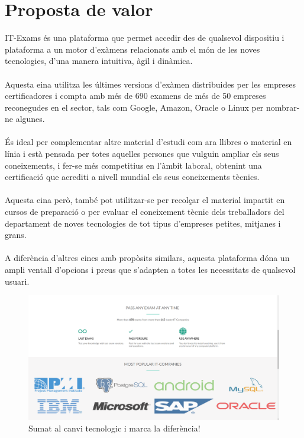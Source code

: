 \documentclass[12pt]{article}
\begin{document}
\section{Proposta de valor}
IT-Exams és una plataforma que permet accedir des de qualsevol dispositiu i plataforma a un motor d'exàmens relacionats amb el món de les noves tecnologies, d'una manera intuitiva, àgil i dinàmica. 
\\\\Aquesta eina utilitza les últimes versions d'exàmen distribuides per les empreses certificadores i compta amb més de 690 examens de més de 50 empreses reconegudes en el sector, tals com Google, Amazon, Oracle o Linux per nombrar-ne algunes. 
\\\\És ideal per complementar altre material d'estudi com ara llibres o material en línia i està pensada per totes aquelles persones que vulguin ampliar els seus coneixements, i fer-se més competitius en l'àmbit laboral, obtenint una certificació que acrediti a nivell mundial els seus coneixements tècnics. 
\\\\Aquesta eina però, també pot utilitzar-se per recolçar el material impartit en cursos de preparació o per evaluar el coneixement tècnic dels treballadors del departament de noves tecnologies de tot tipus d'empreses petites, mitjanes i grans.
\\\\A diferència d'altres eines amb propòsits similars, aquesta plataforma dóna un ampli ventall d'opcions i preus que s'adapten a totes les necessitats de qualsevol usuari.
\begin{landscape}
\begin{figure}
	\centering
	\includegraphics[width=1.5\textwidth]{imatges/valor.png}\par\vspace{1cm}
	\caption{Sumat al canvi tecnologic i marca la diferència!}
\end{figure}
\end{landscape}
\end{document}
